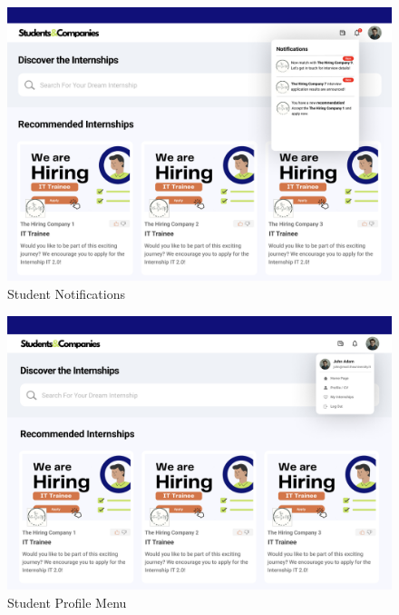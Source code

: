 \documentclass[a4paper,12pt]{article}
\begin{document}
\begin{figure}[H]
    \centering
    \includegraphics[scale = 0.435]{figures/UserInterfaces/Student/Notifications.png}
    \caption{Student Notifications}
     \centering
\end{figure}

\begin{figure}[H]
    \centering
    \includegraphics[scale = 0.40]{figures/UserInterfaces/Student/ProfileMenu.png}
    \caption{Student Profile Menu}
     \centering
\end{figure}
\end{document}
